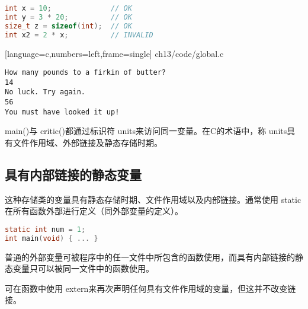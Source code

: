 \begin{frame}[fragile]
\begin{lstlisting}[language=c,frame=single]
int x = 10;              // OK
int y = 3 * 20;          // OK
size_t z = sizeof(int);  // OK
int x2 = 2 * x;          // INVALID
\end{lstlisting}
\end{frame}

\begin{frame}
  
  [language=c,numbers=left,frame=single]
  {ch13/code/global.c}
\end{frame}

\begin{frame}
\begin{lstlisting}[backgroundcolor=\color{red!20}]
How many pounds to a firkin of butter?
14
No luck. Try again.
56
You must have looked it up!
\end{lstlisting}
\end{frame}

\begin{frame}[fragile]
  { main()}与{ critic()}都通过标识符{ units}来访问同一变量。在C的术语中，称{ units}具有文件作用域、外部链接及静态存储时期。
\end{frame}
  
\subsection{具有内部链接的静态变量}
\begin{frame}[fragile]\ft{\subsecname}
  这种存储类的变量具有静态存储时期、文件作用域以及内部链接。通常使用{ static}在所有函数外部进行定义（同外部变量的定义）。
  \begin{lstlisting}[language=c,frame=single]
static int num = 1;
int main(void) { ... }    
\end{lstlisting}
\end{frame}
 
 \begin{frame}[fragile]\ft{\subsecname}
   普通的外部变量可被程序中的任一文件中所包含的函数使用，而具有内部链接的静态变量只可以被同一文件中的函数使用。
\end{frame}
 
 \begin{frame}[fragile]\ft{\subsecname}
   可在函数中使用{ extern}来再次声明任何具有文件作用域的变量，但这并不改变链接。
\end{frame}
 
